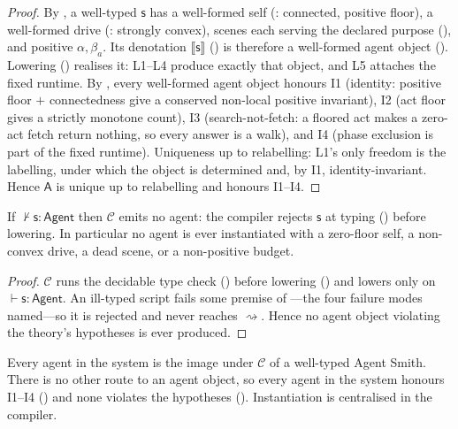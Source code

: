 \documentclass[11pt,twocolumn,a4paper]{article}
\newcommand{\Agent}{\mathsf{A}}
\newcommand{\floorc}{\beta}
\newcommand{\att}{\alpha}
\newcommand{\spec}{\mathsf{s}}         %
\newcommand{\compile}{\mathcal{C}}     %
\newcommand{\judge}{\vdash}
\newcommand{\lowers}{\rightsquigarrow} %
\begin{document}
\begin{proof}
By , a well-typed $\spec$ has a well-formed self
(: connected, positive floor), a well-formed drive
(: strongly convex), scenes each serving the declared purpose
(), and positive $\att,\floorc_a$. Its denotation
$\llbracket\spec\rrbracket$ () is therefore a well-formed
agent object (). Lowering ()
realises it: L1--L4 produce exactly that object, and L5 attaches the fixed
runtime. By , every well-formed agent object honours I1
(identity: positive floor $+$ connectedness give a conserved non-local
positive invariant), I2 (act floor gives a strictly monotone count), I3
(search-not-fetch: a floored act makes a zero-act fetch return nothing, so
every answer is a walk), and I4 (phase exclusion is part of the fixed
runtime). Uniqueness up to relabelling: L1's only freedom is the labelling,
under which the object is determined and, by I1, identity-invariant. Hence
$\Agent$ is unique up to relabelling and honours I1--I4.
\end{proof}

\begin{theorem}
\label{thm:no-illtyped}
If $\not\judge\spec:\mathsf{Agent}$ then $\compile$ emits no agent: the
compiler rejects $\spec$ at typing () before lowering. In
particular no agent is ever instantiated with a zero-floor self, a non-convex
drive, a dead scene, or a non-positive budget.
\end{theorem}

\begin{proof}
$\compile$ runs the decidable type check () before
lowering () and lowers only on
$\judge\spec:\mathsf{Agent}$. An ill-typed script fails some premise of
---the four failure modes
named---so it is rejected and never reaches $\lowers$. Hence no agent object
violating the theory's hypotheses is ever produced.
\end{proof}

\begin{corollary}
\label{cor:sole}
Every agent in the system is the image under $\compile$ of a well-typed Agent
Smith. There is no other route to an agent object, so every agent in the
system honours I1--I4 () and none violates the
hypotheses (). Instantiation is centralised in the
compiler.
\end{corollary}
\end{document}
